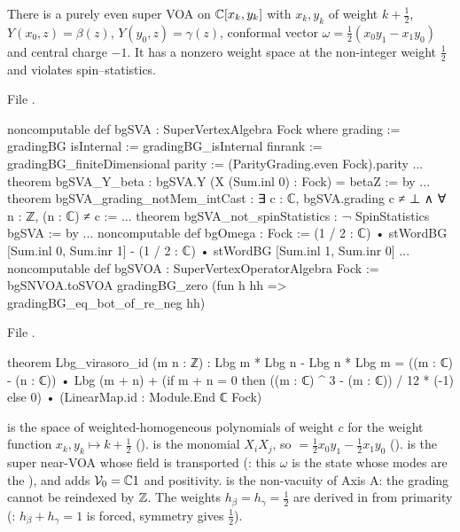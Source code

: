\begin{theorem}\label{l17:thm:bgsvoa}
There is a purely even super VOA  on ${\mathbb{C}}[x_k,y_k]$ with $x_k,y_k$ of weight $k+\frac12$,
$Y(x_0,z)=\beta(z)$, $Y(y_0,z)=\gamma(z)$, conformal vector
$\omega=\frac12(x_0y_1-x_1y_0)$ and central charge $-1$. It has a nonzero weight space at the
non-integer weight $\frac12$ and violates spin--statistics.
\end{theorem}
\noindent File .
\begin{leancode}
noncomputable def bgSVA : SuperVertexAlgebra Fock where
  grading := gradingBG
  isInternal := gradingBG_isInternal
  finrank := gradingBG_finiteDimensional
  parity := (ParityGrading.even Fock).parity
...
theorem bgSVA_Y_beta : bgSVA.Y (X (Sum.inl 0) : Fock) = betaZ := by
...
theorem bgSVA_grading_notMem_intCast :
    ∃ c : ℂ, bgSVA.grading c ≠ ⊥ ∧ ∀ n : ℤ, (n : ℂ) ≠ c :=
...
theorem bgSVA_not_spinStatistics : ¬ SpinStatistics bgSVA := by
...
noncomputable def bgOmega : Fock :=
  (1 / 2 : ℂ) • stWordBG [Sum.inl 0, Sum.inr 1]
    - (1 / 2 : ℂ) • stWordBG [Sum.inl 1, Sum.inr 0]
...
noncomputable def bgSVOA : SuperVertexOperatorAlgebra Fock :=
  bgSNVOA.toSVOA gradingBG_zero (fun h hh => gradingBG_eq_bot_of_re_neg hh)
\end{leancode}
\noindent File .
\begin{leancode}
theorem Lbg_virasoro_id (m n : ℤ) :
    Lbg m * Lbg n - Lbg n * Lbg m
      = ((m : ℂ) - (n : ℂ)) • Lbg (m + n)
        + (if m + n = 0 then ((m : ℂ) ^ 3 - (m : ℂ)) / 12 * (-1) else 0)
            • (LinearMap.id : Module.End ℂ Fock)
\end{leancode}
\begin{dictionary}
 is the space of weighted-homogeneous polynomials of weight $c$ for the weight
function $x_k,y_k\mapsto k+\frac12$ ().  is the monomial $X_iX_j$, so
 $=\frac12x_0y_1-\frac12x_1y_0$ ().  is the super near-VOA
whose  field is  transported (: this $\omega$
is the state whose modes are the ), and  adds $\mathcal{V}_0={\mathbb{C}}1$ and
positivity.  is the non-vacuity of Axis A: the grading cannot be
reindexed by ${\mathbb{Z}}$. The weights $h_\beta=h_\gamma=\frac12$ are derived in 
from primarity (: $h_\beta+h_\gamma=1$ is forced, symmetry gives $\frac12$).
\end{dictionary}
